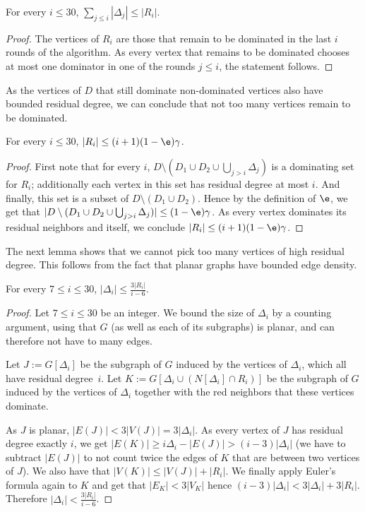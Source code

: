\begin{lemma}\label{lem:total-h}
  For every $i\le 30$, $\sum\limits_{j\le i}|\Delta_j| \le |R_i|$.
\end{lemma}
\begin{proof}
  The vertices of $R_i$ are those that remain to be dominated in the
  last $i$ rounds of the algorithm. As every vertex that remains to be
  dominated chooses at most one dominator in one of the rounds
  $j\leq i$, the statement follows.
\end{proof}

\pagebreak
As the vertices of $D$ that still dominate non-dominated vertices also
have bounded residual degree, we can conclude that not too many
vertices remain to be dominated.
\begin{lemma}\label{lem:h1}
  For every $i\le 30$, $|R_i| \le (i+1)(1-\e)\gamma$.
\end{lemma}
\begin{proof}
  First note that for every $i$,
  $D\setminus (D_1\cup D_2\cup \bigcup_{j>i}\Delta_j)$ is a dominating
  set for $R_i$; additionally each vertex in this set has residual
  degree at most $i$.  And finally, this set is a subset of
  $D\setminus (D_1\cup D_2)$. Hence by the definition of $\e$, we get
  that
  $|D\setminus (D_1\cup D_2\cup \bigcup_{j>i}\Delta_j)|\le
  (1-\e)\gamma$. As every vertex dominates its residual neighbors and
  itself, we conclude $|R_i|\le (i+1)(1-\e)\gamma$.
\end{proof}

The next lemma shows that we cannot pick too many vertices of high
residual degree. This follows from the fact that planar graphs have
bounded edge density.

\begin{lemma}\label{lem:delta}
  For every $7\le i\le 30$, $|\Delta_i| \le \frac{3|R_i|}{i-6}$.
\end{lemma}
\begin{proof}
  Let $7\le i\le 30$ be an integer. We bound the size of $\Delta_i$
  by a counting argument, using that $G$ (as well as each of its
  subgraphs) is planar, and can therefore not have to many edges.

  Let $J := G[\Delta_i]$ be the subgraph of $G$ induced by the
  vertices of $\Delta_i$, which all have residual degree~$i$. Let
  $K := G[\Delta_i \cup (N[\Delta_i]\cap R_i)]$ be the subgraph of $G$
  induced by the vertices of $\Delta_i$ together with the red
  neighbors that these vertices dominate.

  As $J$ is planar, $|E(J)| < 3|V(J)| = 3|\Delta_i|$. As every
  vertex of $J$ has residual degree exactly $i$, we get
  $|E(K)| \geq i\Delta_i - |E(J)| > (i-3)|\Delta_i|$ (we have to
  subtract $|E(J)|$ to not count twice the edges of $K$ that are
  between two vertices of $J$).  We also have that
  $|V(K)| \le |V(J)| + |R_i|$. We finally apply Euler's formula again
  to $K$ and get that $|E_K| < 3|V_K|$ hence
  $(i-3)|\Delta_i| < 3|\Delta_i| + 3|R_i|$. Therefore
  $|\Delta_i|< \frac{3|R_i|}{i-6}$.
\end{proof}

